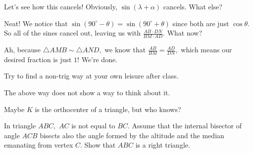 Let's see how this cancels! Obviously, $\sin{(\lambda+\alpha)}$ cancels. What else?





Neat! We notice that $\sin{(90^{\circ} - \theta)} = \sin{(90^{\circ} + \theta)}$ since both are just $\cos \theta.$ So all of the sines cancel out, leaving us with $\frac{AB \cdot DN}{BM \cdot AD}.$ What now?


Ah, because $\triangle AMB \sim \triangle AND,$ we know that $\frac{AB}{BM} = \frac{AD}{DN},$ which means our desired fraction is just $1!$ We're done.


Try to find a non-trig way at your own leisure after class.


The above way does not show a way to think about it.

Maybe $K$ is the orthocenter of a triangle, but who knows?

\begin{example}
In triangle $ABC,$ $AC$ is not equal to $BC.$  Assume that the internal bisector of angle $ACB$ bisects also the angle formed by the altitude and the median emanating from vertex $C.$  Show that $ABC$ is a right triangle.    
\end{example}

